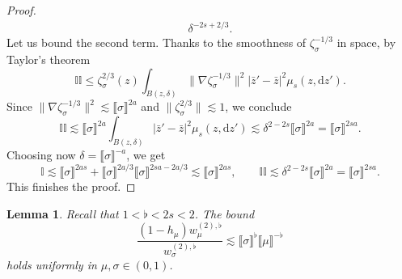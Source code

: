 \documentclass{article}
\numberwithin{equation}{section}
\newcommand{\mathd}{\mathrm{d}}
\theoremstyle{plain}
\newtheorem{lemma}[theorem]{Lemma}
\theoremstyle{definition}
\begin{document}
\begin{proof}
\begin{align*}
    \delta^{- 2 s + 2 / 3} .
  \end{align*}
  Let us bound the second term. Thanks to the smoothness of $\zeta_{\sigma}^{-
  1 / 3}$ in space, by Taylor's theorem
  \[ \mathbb{I}\mathbb{I} \leqslant \zeta_{\sigma}^{2 / 3} (z) \int_{B (z,
     \delta)} \| \nabla  \zeta_{\sigma}^{- 1 / 3} \|^2  | \bar{z}' - \bar z |^2
     \mu_s (z, \mathd z') . \]
  Since $\| \nabla  \zeta_{\sigma}^{- 1 / 3} \|^2 \lesssim \llbracket \sigma
  \rrbracket^{2 a}$ and $\| \zeta_{\sigma}^{2 / 3} \| \lesssim 1$, we conclude
  \[ \mathbb{I}\mathbb{I} \lesssim \llbracket \sigma \rrbracket^{2 a} \int_{B
     (z, \delta)} | \bar{z}' - \bar{z} |^2 \mu_s (z, \mathd z') \lesssim
     \delta^{2 - 2 s} \llbracket \sigma \rrbracket^{2 a} = \llbracket \sigma
     \rrbracket^{2 sa} . \]
  Choosing now $\delta = \llbracket \sigma \rrbracket^{- a}$, we get
  \[ \mathbb{I} \lesssim \llbracket \sigma \rrbracket^{2 as} + \llbracket
     \sigma \rrbracket^{2 a / 3} \llbracket \sigma \rrbracket^{2 s a - 2 a /
     3} \lesssim \llbracket \sigma \rrbracket^{2 as}, \qquad
     \mathbb{I}\mathbb{I} \lesssim \delta^{2 - 2 s} \llbracket \sigma
     \rrbracket^{2 a} = \llbracket \sigma \rrbracket^{2 sa} . \]
  This finishes the proof.
\end{proof}

\begin{lemma}
  \label{lem:weight-interaction} Recall that $1<\flat<2s<2$. The bound
  \[ \frac{(1 - h_{\mu}) w^{(2), \flat}_{\mu}}{w^{(2), \flat}_{\sigma}}
     \lesssim \llbracket \sigma \rrbracket^{\flat} \llbracket \mu
     \rrbracket^{- \flat} \]
  holds uniformly in $\mu, \sigma \in (0, 1)$.
\end{lemma}
\end{document}
